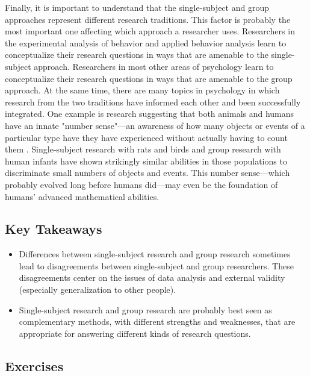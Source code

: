 Finally, it is important to understand that the single-subject and group approaches represent different research traditions. This factor is probably the most important one affecting which approach a researcher uses. Researchers in the experimental analysis of behavior and applied behavior analysis learn to conceptualize their research questions in ways that are amenable to the single-subject approach. Researchers in most other areas of psychology learn to conceptualize their research questions in ways that are amenable to the group approach. At the same time, there are many topics in psychology in which research from the two traditions have informed each other and been successfully integrated. One example is research suggesting that both animals and humans have an innate "number sense"---an awareness of how many objects or events of a particular type have they have experienced without actually having to count them \citep{dehaene_number_2011}. Single-subject research with rats and birds and group research with human infants have shown strikingly similar abilities in those populations to discriminate small numbers of objects and events. This number sense---which probably evolved long before humans did---may even be the foundation of humans' advanced mathematical abilities.



\subsection{Key Takeaways}

\begin{fullwidth}
\begin{itemize}

\item Differences between single-subject research and group research sometimes lead to disagreements between single-subject and group researchers. These disagreements center on the issues of data analysis and external validity (especially generalization to other people).
\item Single-subject research and group research are probably best seen as complementary methods, with different strengths and weaknesses, that are appropriate for answering different kinds of research questions.

\end{itemize}
\end{fullwidth}




\subsection{Exercises}

